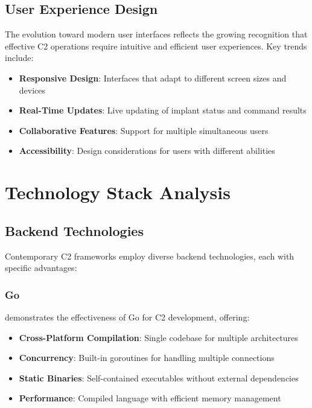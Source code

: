 \subsection{User Experience Design}
\label{subsec:ux_design}

The evolution toward modern user interfaces reflects the growing recognition that effective C2 operations require intuitive and efficient user experiences. Key trends include:

\begin{itemize}
\item \textbf{Responsive Design}: Interfaces that adapt to different screen sizes and devices
\item \textbf{Real-Time Updates}: Live updating of implant status and command results
\item \textbf{Collaborative Features}: Support for multiple simultaneous users
\item \textbf{Accessibility}: Design considerations for users with different abilities
\end{itemize}

\section{Technology Stack Analysis}
\label{sec:technology_analysis}

\subsection{Backend Technologies}
\label{subsec:backend_technologies}

Contemporary C2 frameworks employ diverse backend technologies, each with specific advantages:

\subsubsection{Go}

 demonstrates the effectiveness of Go for C2 development, offering:
\begin{itemize}
\item \textbf{Cross-Platform Compilation}: Single codebase for multiple architectures
\item \textbf{Concurrency}: Built-in goroutines for handling multiple connections
\item \textbf{Static Binaries}: Self-contained executables without external dependencies
\item \textbf{Performance}: Compiled language with efficient memory management
\end{itemize}


